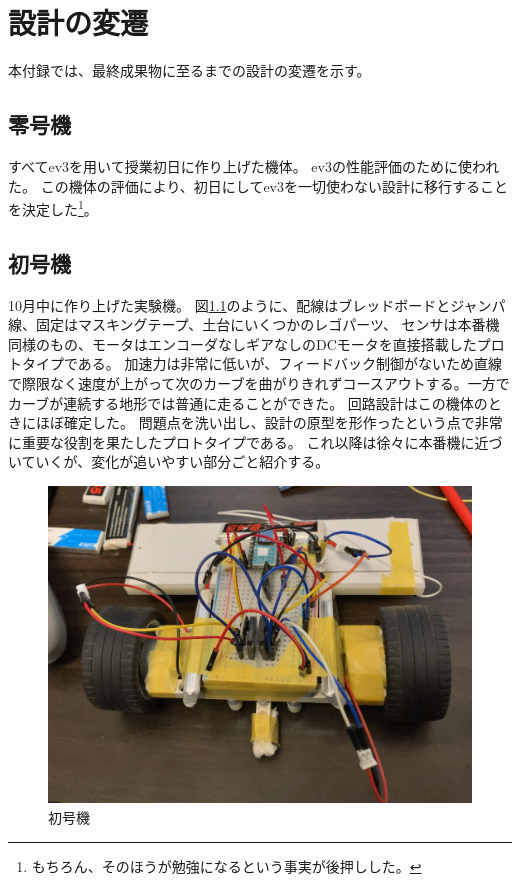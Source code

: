 \documentclass{ltjsreport}
\begin{document}



\chapter{設計の変遷}
本付録では、最終成果物に至るまでの設計の変遷を示す。

\section{零号機}
すべてev3を用いて授業初日に作り上げた機体。
ev3の性能評価のために使われた。
この機体の評価により、初日にしてev3を一切使わない設計に移行することを決定した\footnote{もちろん、そのほうが勉強になるという事実が後押しした。}。

\section{初号機}
10月中に作り上げた実験機。
図\ref{fig:b_machine}のように、配線はブレッドボードとジャンパ線、固定はマスキングテープ、土台にいくつかのレゴパーツ、
センサは本番機同様のもの、モータはエンコーダなしギアなしのDCモータを直接搭載したプロトタイプである。
加速力は非常に低いが、フィードバック制御がないため直線で際限なく速度が上がって次のカーブを曲がりきれずコースアウトする。一方でカーブが連続する地形では普通に走ることができた。
回路設計はこの機体のときにほぼ確定した。
問題点を洗い出し、設計の原型を形作ったという点で非常に重要な役割を果たしたプロトタイプである。
これ以降は徐々に本番機に近づいていくが、変化が追いやすい部分ごと紹介する。
\begin{figure}[bth]
  \centering
  \includegraphics[keepaspectratio, scale=0.2]
       {img/beginning_machine.jpg}
  \caption{初号機}
  \label{fig:b_machine}
 \end{figure}
\end{document}
